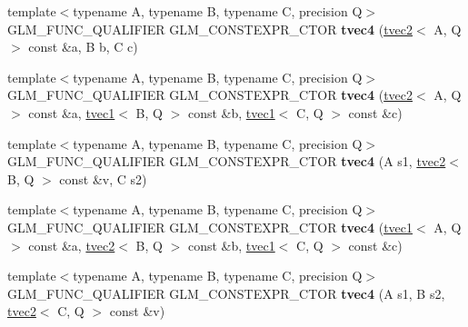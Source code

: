 \begin{DoxyCompactItemize}
\item 
\mbox{\label{structglm_1_1tvec4_abc80d97085b0385612ae216bde4c830c}} 
{\footnotesize template$<$typename A, typename B, typename C, precision Q$>$ }\\G\+L\+M\+\_\+\+F\+U\+N\+C\+\_\+\+Q\+U\+A\+L\+I\+F\+I\+ER G\+L\+M\+\_\+\+C\+O\+N\+S\+T\+E\+X\+P\+R\+\_\+\+C\+T\+OR {\bfseries tvec4} (\hyperlink{structglm_1_1tvec2}{tvec2}$<$ A, Q $>$ const \&a, B b, C c)
\item 
\mbox{\label{structglm_1_1tvec4_a959ee910b134382dde25fab416907997}} 
{\footnotesize template$<$typename A, typename B, typename C, precision Q$>$ }\\G\+L\+M\+\_\+\+F\+U\+N\+C\+\_\+\+Q\+U\+A\+L\+I\+F\+I\+ER G\+L\+M\+\_\+\+C\+O\+N\+S\+T\+E\+X\+P\+R\+\_\+\+C\+T\+OR {\bfseries tvec4} (\hyperlink{structglm_1_1tvec2}{tvec2}$<$ A, Q $>$ const \&a, \hyperlink{structglm_1_1tvec1}{tvec1}$<$ B, Q $>$ const \&b, \hyperlink{structglm_1_1tvec1}{tvec1}$<$ C, Q $>$ const \&c)
\item 
\mbox{\label{structglm_1_1tvec4_a8b7af1627a9ecb07b5c1a2f5dc43616d}} 
{\footnotesize template$<$typename A, typename B, typename C, precision Q$>$ }\\G\+L\+M\+\_\+\+F\+U\+N\+C\+\_\+\+Q\+U\+A\+L\+I\+F\+I\+ER G\+L\+M\+\_\+\+C\+O\+N\+S\+T\+E\+X\+P\+R\+\_\+\+C\+T\+OR {\bfseries tvec4} (A s1, \hyperlink{structglm_1_1tvec2}{tvec2}$<$ B, Q $>$ const \&v, C s2)
\item 
\mbox{\label{structglm_1_1tvec4_af9833d7afc46eeb6770f0a08f7a8e169}} 
{\footnotesize template$<$typename A, typename B, typename C, precision Q$>$ }\\G\+L\+M\+\_\+\+F\+U\+N\+C\+\_\+\+Q\+U\+A\+L\+I\+F\+I\+ER G\+L\+M\+\_\+\+C\+O\+N\+S\+T\+E\+X\+P\+R\+\_\+\+C\+T\+OR {\bfseries tvec4} (\hyperlink{structglm_1_1tvec1}{tvec1}$<$ A, Q $>$ const \&a, \hyperlink{structglm_1_1tvec2}{tvec2}$<$ B, Q $>$ const \&b, \hyperlink{structglm_1_1tvec1}{tvec1}$<$ C, Q $>$ const \&c)
\item 
\mbox{\label{structglm_1_1tvec4_a7c5b0ba598e82707bb5004ae86530cdb}} 
{\footnotesize template$<$typename A, typename B, typename C, precision Q$>$ }\\G\+L\+M\+\_\+\+F\+U\+N\+C\+\_\+\+Q\+U\+A\+L\+I\+F\+I\+ER G\+L\+M\+\_\+\+C\+O\+N\+S\+T\+E\+X\+P\+R\+\_\+\+C\+T\+OR {\bfseries tvec4} (A s1, B s2, \hyperlink{structglm_1_1tvec2}{tvec2}$<$ C, Q $>$ const \&v)

\end{DoxyCompactItemize}
